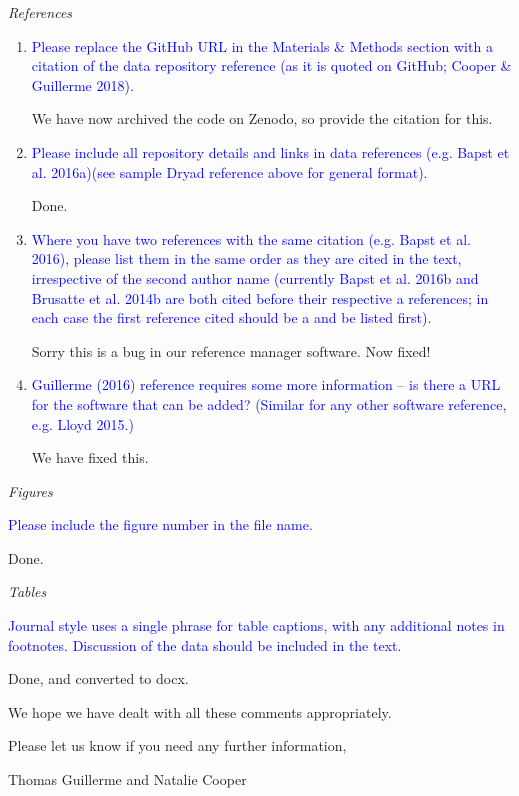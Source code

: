 \documentclass[12pt,letterpaper]{article}
\renewcommand{\subsection}[1]{%
\bigskip
\begin{center}
\begin{large}
\normalfont\itshape #1
\end{large}
\end{center}}
\begin{document}
\subsection{References}

\begin{enumerate}

\item{\textcolor{blue}{Please replace the GitHub URL in the Materials \& Methods section with a citation of the data repository reference (as it is quoted on GitHub; Cooper \& Guillerme 2018).}}

We have now archived the code on Zenodo, so provide the citation for this.

\item{\textcolor{blue}{Please include all repository details and links in data references (e.g. Bapst et al. 2016a)(see sample Dryad reference above for general format).}}

Done.

\item{\textcolor{blue}{Where you have two references with the same citation (e.g. Bapst et al. 2016), please list them in the same order as they are cited in the text, irrespective of the second author name (currently Bapst et al. 2016b and Brusatte et al. 2014b are both cited before their respective a references; in each case the first reference cited should be a and be listed first).}}

Sorry this is a bug in our reference manager software. Now fixed!

\item{\textcolor{blue}{Guillerme (2016) reference requires some more information – is there a URL for the software that can be added? (Similar for any other software reference, e.g. Lloyd 2015.)}}

We have fixed this.


\end{enumerate}

\subsection{Figures}
\textcolor{blue}{Please include the figure number in the file name.}

Done.

\subsection{Tables}
\textcolor{blue}{Journal style uses a single phrase for table captions, with any additional notes in footnotes. Discussion of the data should be included in the text.}

Done, and converted to docx.

We hope we have dealt with all these comments appropriately. 

Please let us know if you need any further information,

Thomas Guillerme and Natalie Cooper
\end{document}
